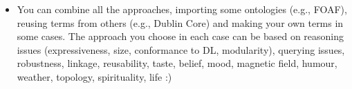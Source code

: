 \begin{itemize}
\begin{enumerate}
	\end{enumerate}
	\item	You can combine all the approaches, importing some ontologies (e.g., FOAF), reusing terms from others (e.g., Dublin Core) and making your own terms in some cases. The approach you choose in each case can be based on reasoning issues (expressiveness, size, conformance to DL, modularity), querying issues, robustness, linkage, reusability, taste, belief, mood, magnetic field, humour, weather, topology, spirituality, life :)
\end{itemize}


